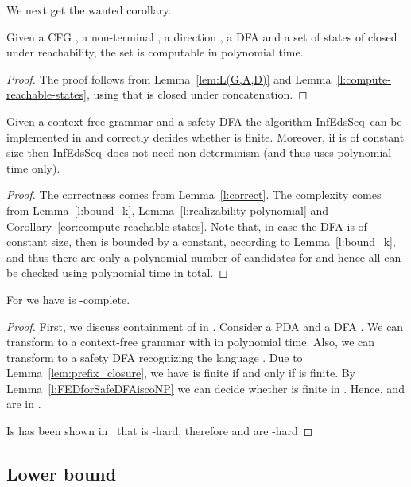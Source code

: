 \documentclass{CSML}
\newcommand{\algoFEDPDADFA}{\textsf{InfEdsSeq}}
\begin{document}
We next get the wanted corollary.
\begin{cor}\label{cor:compute-reachable-states}
Given a CFG , a non-terminal , a direction , a DFA  and a set of states  of  closed under reachability, 
the set  is computable in polynomial time.
\end{cor}
\begin{proof}
The proof follows from Lemma~\ref{lem:L(G,A,D)} and Lemma~\ref{l:compute-reachable-states}, using that  is closed under concatenation.
\end{proof}



\begin{lem}
Given a context-free grammar  and a safety DFA  the algorithm \algoFEDPDADFA\ can be implemented in  and correctly decides whether  is finite.
Moreover, if  is of constant size then \algoFEDPDADFA\ does not need non-determinism (and thus uses polynomial time only).
\label{l:FEDforSafeDFAiscoNP}
\end{lem}
\begin{proof}
The correctness comes from Lemma~\ref{l:correct}. The complexity comes from Lemma~\ref{l:bound_k}, Lemma~\ref{l:realizability-polynomial} and Corollary~\ref{cor:compute-reachable-states}. Note that, in case the DFA is of constant size, then  is bounded by a constant, according to Lemma~\ref{l:bound_k}, and thus there are only a polynomial number of candidates for  and hence all can be checked using polynomial time in total.
\end{proof}


\begin{thm}
For  we have  is -complete.
\label{th:FEDonDFAcoNP}
\end{thm}
\begin{proof}
First, we discuss containment of  in .
Consider a PDA  and a DFA . We can transform 
to a context-free grammar  with  in polynomial time. 
Also, we can transform  to a safety DFA  recognizing
the language .  
Due to Lemma~\ref{lem:prefix_closure}, we have 
 is finite if and only if  is finite. 
By Lemma~\ref{l:FEDforSafeDFAiscoNP} we can decide whether  is finite
in . Hence,  and  are in .

Is has been shown in~\cite{boundedRiveros} that  is -hard, therefore
 and  are -hard
\end{proof}








\subsection{Lower bound}
\label{sec:FEDLowerBound}
\end{document}
